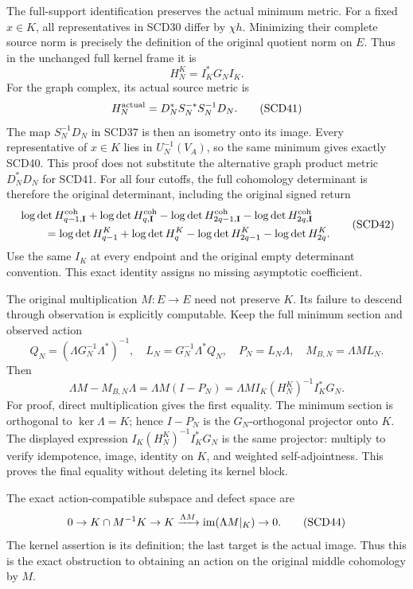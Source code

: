 The full-support identification preserves the actual minimum metric.
For a fixed \(x\in K\), all representatives in SCD30 differ by
\(\chi h\). Minimizing their complete source norm is precisely
the definition of the original quotient norm on \(E\). Thus in
the unchanged full kernel frame it is
\[
 H^K_N=I_K^*G_NI_K .
 \tag{SCD40}
\]
For the graph complex, its actual source metric is
\[
 H_N^{\rm actual}=D_N^*S_N^{-*}S_N^{-1}D_N .
 \tag{SCD41}
\]
The map \(S_N^{-1}D_N\) in SCD37 is then an isometry onto its
image. Every representative of \(x\in K\) lies in
\(U_N^{-1}(V_A)\), so the same minimum gives exactly SCD40.
This proof does not substitute the alternative graph product
metric \(D_N^*D_N\) for SCD41. For all four cutoffs, the full
cohomology determinant is therefore the original determinant,
including the original signed return
\[
 \begin{split}
 &\log\det H^{\rm coh}_{q-1,\mathbf I}
 +\log\det H^{\rm coh}_{q,\mathbf I}
 -\log\det H^{\rm coh}_{2q-1,\mathbf I}
 -\log\det H^{\rm coh}_{2q,\mathbf I}\\
 &\hspace{8mm}=
 \log\det H^K_{q-1}+\log\det H^K_q
 -\log\det H^K_{2q-1}-\log\det H^K_{2q}.
 \end{split}
 \tag{SCD42}
\]
Use the same \(I_K\) at every endpoint and the original empty
determinant convention. This exact identity assigns no missing
asymptotic coefficient.

The original multiplication \(M:E\to E\) need not preserve \(K\).
Its failure to descend through observation is explicitly computable.
Keep the full minimum section and observed action
\[
 Q_N=(\Lambda G_N^{-1}\Lambda^*)^{-1},\quad
 L_N=G_N^{-1}\Lambda^*Q_N,\quad P_N=L_N\Lambda,\quad
 M_{B,N}=\Lambda ML_N .
\]
Then
\[
 \Lambda M-M_{B,N}\Lambda
 =\Lambda M(I-P_N)
 =\Lambda MI_K(H_N^K)^{-1}I_K^*G_N .
 \tag{SCD43}
\]
For proof, direct multiplication gives the first equality.
The minimum section is orthogonal to \(\ker\Lambda=K\);
hence \(I-P_N\) is the \(G_N\)-orthogonal projector onto \(K\).
The displayed expression \(I_K(H_N^K)^{-1}I_K^*G_N\)
is the same projector: multiply to verify idempotence, image,
identity on \(K\), and weighted self-adjointness. This proves
the final equality without deleting its kernel block.

The exact action-compatible subspace and defect space are
\[
 0\to K\cap M^{-1}K\to K
 \xrightarrow{\Lambda M}\operatorname{im}(\Lambda M|_K)\to0.
 \tag{SCD44}
\]
The kernel assertion is its definition; the last target is the
actual image. Thus this is the exact obstruction to obtaining
an action on the original middle cohomology by \(M\).

